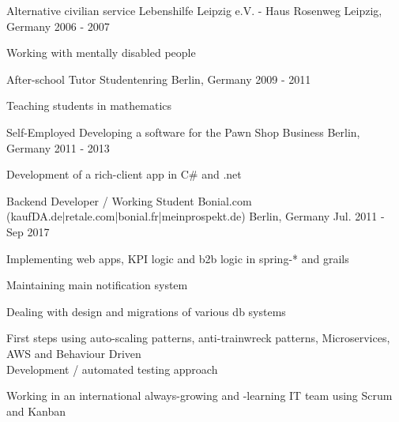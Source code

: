


\begin{cventries}


\cventry
{Alternative civilian service} %
{Lebenshilfe Leipzig e.V. - Haus Rosenweg} %
{Leipzig, Germany} %
{2006 - 2007} %
{ %
\begin{cvitems}
\item {Working with mentally disabled people}
\end{cvitems}
}

\cventry
{After-school Tutor} %
{Studentenring} %
{Berlin, Germany} %
{2009 - 2011} %
{ %
\begin{cvitems}
\item {Teaching students in mathematics}
\end{cvitems}
}

\cventry
{Self-Employed} %
{Developing a software for the Pawn Shop Business} %
{Berlin, Germany} %
{2011 - 2013} %
{ %
\begin{cvitems}
\item {Development of a rich-client app in C\# and .net}
\end{cvitems}
}

\cventry
{Backend Developer / Working Student} %
{Bonial.com (kaufDA.de|retale.com|bonial.fr|meinprospekt.de)} %
{Berlin, Germany} %
{Jul. 2011 - Sep 2017} %
{ %
\begin{cvitems}
\item {Implementing web apps, KPI logic and b2b logic in spring-* and grails}
\item {Maintaining main notification system}
\item {Dealing with design and migrations of various db systems}
\item {First steps using auto-scaling patterns, anti-trainwreck patterns, Microservices, AWS and Behaviour Driven \\ Development / automated testing approach}
\item {Working in an international always-growing and -learning IT team using Scrum and Kanban}
\end{cvitems}
}


\end{cventries}

